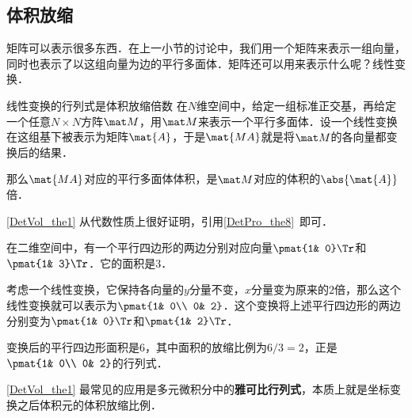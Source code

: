 



\subsection{体积放缩}

矩阵可以表示很多东西．在上一小节的讨论中，我们用一个矩阵来表示一组向量，同时也表示了以这组向量为边的平行多面体．矩阵还可以用来表示什么呢？线性变换．

\begin{theorem}{线性变换的行列式是体积放缩倍数}\label{DetVol_the1}
在$N$维空间中，给定一组标准正交基，再给定一个任意$N\times N$方阵$\mat M$，用$\mat M$来表示一个平行多面体．设一个线性变换在这组基下被表示为矩阵$\mat{A}$，于是$\mat{MA}$就是将$\mat M$的各向量都变换后的结果．

那么$\mat{MA}$对应的平行多面体体积，是$\mat M$对应的体积的$\abs{\mat{A}}$倍．
\end{theorem}

\autoref{DetVol_the1} 从代数性质上很好证明，引用\autoref{DetPro_the8}~即可．

\begin{example}{}
在二维空间中，有一个平行四边形的两边分别对应向量$\pmat{1& 0}\Tr$和$\pmat{1& 3}\Tr$．它的面积是$3$．

考虑一个线性变换，它保持各向量的$y$分量不变，$x$分量变为原来的$2$倍，那么这个线性变换就可以表示为$\pmat{1& 0\\ 0& 2}$．这个变换将上述平行四边形的两边分别变为$\pmat{1& 0}\Tr$和$\pmat{1& 2}\Tr$．

变换后的平行四边形面积是$6$，其中面积的放缩比例为$6/3=2$，正是$\pmat{1& 0\\ 0& 2}$的行列式．
\end{example}

\autoref{DetVol_the1} 最常见的应用是多元微积分中的\textbf{雅可比行列式}，本质上就是坐标变换之后体积元的体积放缩比例．



























